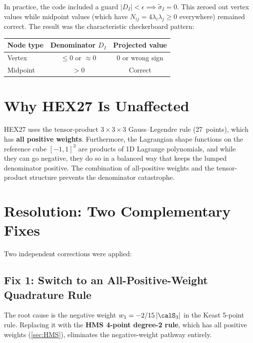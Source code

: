 In practice, the code included a guard $|D_I| < \epsilon \implies
\tilde{\sigma}_I = 0$.  This zeroed out vertex values while midpoint values
(which have $N_{ij} = 4\lambda_i\lambda_j \ge 0$ everywhere) remained correct.
The result was the characteristic checkerboard pattern:

\begin{center}
\begin{tabular}{lcc}
  \toprule
  Node type & Denominator $D_I$ & Projected value \\
  \midrule
  Vertex   & $\le 0$ or $\approx 0$ & $0$ or wrong sign \\
  Midpoint & $> 0$                   & Correct \\
  \bottomrule
\end{tabular}
\end{center}


\section{Why HEX27 Is Unaffected}
\label{sec:hex27_safe}

HEX27 uses the tensor-product $3 \times 3 \times 3$ Gauss--Legendre rule
(27~points), which has \textbf{all positive weights}.  Furthermore, the
Lagrangian shape functions on the reference cube $[-1,1]^3$ are products of 1D
Lagrange polynomials, and while they can go negative, they do so in a balanced
way that keeps the lumped denominator positive.  The combination of all-positive
weights and the tensor-product structure prevents the denominator catastrophe.


\section{Resolution: Two Complementary Fixes}
\label{sec:resolution}

Two independent corrections were applied:

\subsection{Fix 1: Switch to an All-Positive-Weight Quadrature Rule}

The root cause is the negative weight $w_1 = -2/15\,|\calS_3|$ in the Keast
5-point rule.  Replacing it with the \textbf{HMS 4-point degree-2 rule}, which
has all positive weights (\cref{sec:HMS}), eliminates the negative-weight
pathway entirely.

